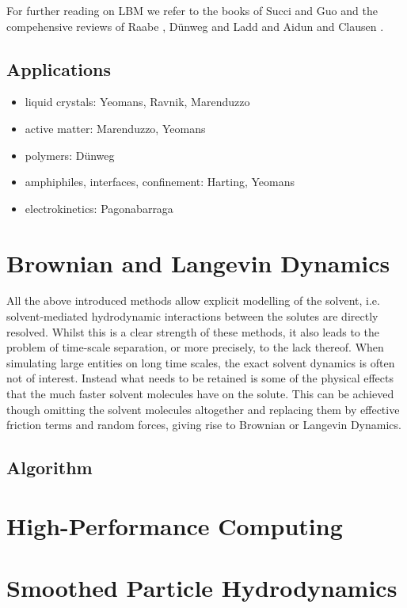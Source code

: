 \documentclass[8.5pt,twoside,twocolumn]{article}
\newcommand{\bit}{\begin{itemize}}
\newcommand{\eit}{\end{itemize}}
\begin{document}
For further reading on LBM we refer to the books of Succi \cite{Succi:2001} and Guo \cite{Guo:2013} and the 
compehensive reviews of Raabe \cite{Raabe:2004}, D\"unweg and Ladd \cite{Duenweg:2009} and Aidun and Clausen \cite{Aidun:2010}.

\subsection{Applications}

\bit
\item liquid crystals: Yeomans, Ravnik, Marenduzzo
\item active matter: Marenduzzo, Yeomans
\item polymers: D\"unweg
\item amphiphiles, interfaces, confinement: Harting, Yeomans 
\item electrokinetics: Pagonabarraga
\eit


\section{Brownian and Langevin Dynamics}

All the above introduced methods allow explicit modelling of the solvent, i.e. solvent-mediated hydrodynamic
interactions between the solutes are directly resolved. Whilst this is a clear strength of these methods, 
it also leads to the problem of time-scale separation, or more precisely, to the lack thereof. 
When simulating large entities on long time scales, the exact solvent dynamics is often not of interest.
Instead what needs to be retained is some of the physical effects that the much faster solvent molecules have
on the solute. This can be achieved though omitting the solvent molecules altogether and replacing them 
by effective friction terms and random forces, giving rise to Brownian or Langevin Dynamics.    

\subsection{Algorithm}



\section{High-Performance Computing}


\section{Smoothed Particle Hydrodynamics}
\end{document}
